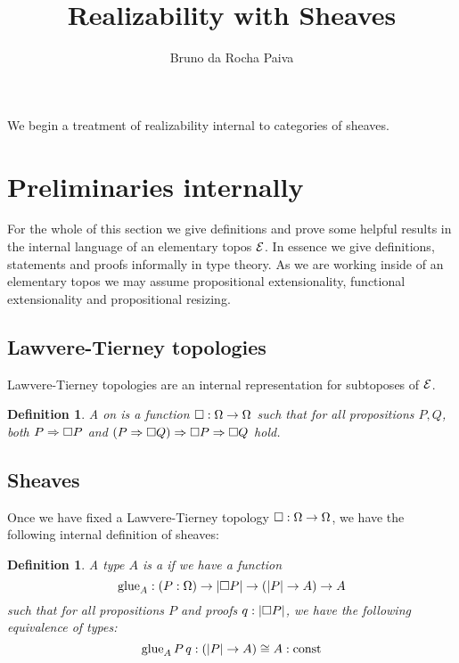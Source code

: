 \documentclass[11pt]{article}
\newtheorem{defn}[thrm]{Definition}
\begin{document}
\title{Realizability with Sheaves}
\author{Bruno da Rocha Paiva}
\maketitle

We begin a treatment of realizability internal to categories of sheaves.

\section{Preliminaries internally}

For the whole of this section we give definitions and prove some
helpful results in the internal language of an elementary topos \(\mathcal{E}\).
%
In essence we give definitions, statements and proofs informally in type theory.
%
As we are working inside of an elementary topos we may assume propositional
extensionality, functional extensionality and propositional resizing.

\subsection{Lawvere-Tierney topologies}%
\label{sub:lawvere-tierney-internal}

Lawvere-Tierney topologies are an internal representation for subtoposes
of \(\mathcal{E}\).

\begin{defn}\label{defn:lawvere-tierney}
  A  on is a function
  \(\Box : \Omega \to \Omega\) such that for all propositions \(P,Q\), both
  \({P}\Rightarrow{\Box{P}}\) and
  \({({P}\Rightarrow{\Box{Q}})}\Rightarrow{{\Box{P}}\Rightarrow{\Box{Q}}}\) hold.
\end{defn}

\subsection{Sheaves}%
\label{sub:sheaves-internal}

Once we have fixed a Lawvere-Tierney topology \(\Box : \Omega \to \Omega\),
we have the following internal definition of sheaves:

\begin{defn}
  A type \(A\) is a  if we have a function
  \[
    \text{glue}_{A} : (P : \Omega) \to |{\Box{P}}| \to (|{P}| \to A) \to A
  \]
  such that for all propositions \(P\) and proofs \(q : |{\Box{P}}|\),
  we have the following equivalence of types:
  \[
    \text{glue}_{A}\,P\,q : (|{P}| \to A) \cong A : \text{const}
  \]
\end{defn}
\end{document}
